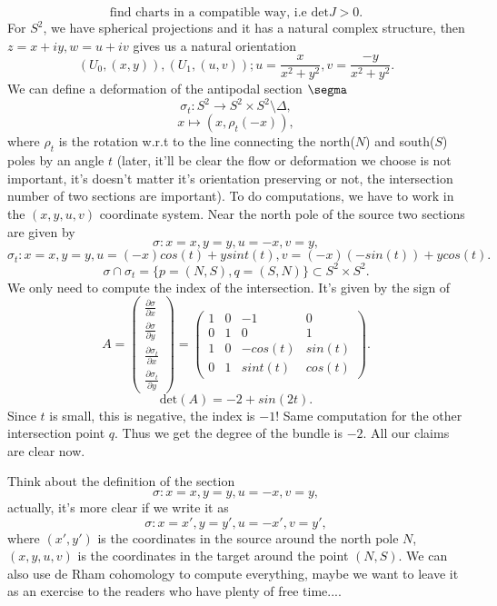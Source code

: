 \documentclass[main.tex]{subfiles}
\begin{document}
$$\text{find charts in a compatible way, i.e $\mathrm{det}J>0.$}$$
For $S^{2}$, we have spherical projections and it has a natural complex structure, then $z=x+iy, w=u+iv$ gives us a natural orientation 
$$(U_{0}, (x,y)), (U_{1}, (u,v)); u=\frac{x}{x^{2}+y^{2}}, v=\frac{-y}{x^{2}+y^{2}}.$$
We can define a deformation of the antipodal section $\segma$
$$\sigma_{t}: S^{2}\rightarrow S^{2}\times S^{2}\setminus\Delta,$$
$$x \mapsto (x, \rho_{t}(-x)),$$
where $\rho_{t}$ is the rotation w.r.t to the line connecting the north($N$) and south($S$) poles by an angle $t$ (later, it'll be clear the flow or deformation we choose is not important, it's doesn't matter it's orientation preserving or not, the intersection number of two sections are important). To do computations, we have to work in the $(x,y,u,v)$ coordinate system. Near the north pole of the source two sections are given by 
$$\sigma:x=x, y=y, u=-x, v=y,$$
$$\sigma_{t}: x=x, y=y, u=(-x)cos(t)+ysint(t), v=(-x)(-sin(t))+ycos(t).$$
$$\sigma\cap \sigma_{t}=\{p=(N,S), q=(S,N)\}\subset S^{2}\times S^{2}.$$
We only need to compute the index of the intersection. It's given by the sign of 
$$A=\begin{pmatrix}\frac{\partial \sigma}{\partial x}\\
\frac{\partial \sigma}{\partial y}\\
\frac{\partial \sigma_{t}}{\partial x}\\
\frac{\partial \sigma_{t}}{\partial y}\end{pmatrix}=\begin{pmatrix}1 & 0 & -1 & 0\\
0 & 1 & 0 & 1\\
1 & 0 & -cos(t) & sin(t)\\
0 & 1 & sint(t) & cos(t)\end{pmatrix}.$$
$$\mathrm{det}(A)=-2+sin(2t).$$
Since $t$ is small, this is negative, the index is $-1$! Same computation for the other intersection point $q$. Thus we get the degree of the bundle is $-2$. All our claims are clear now.
\begin{remark}
Think about the definition of the section 
$$\sigma:x=x, y=y, u=-x, v=y,$$
actually, it's more clear if we write it as 
$$\sigma:x=x', y=y', u=-x', v=y',$$
where $(x',y')$ is the coordinates in the source around the north pole $N$, $(x,y, u,v)$ is the coordinates in the target around the point $(N,S)$. We can also use de Rham cohomology to compute everything, maybe we want to leave it as an exercise to the readers who have plenty of free time....
\end{remark}
\end{document}

